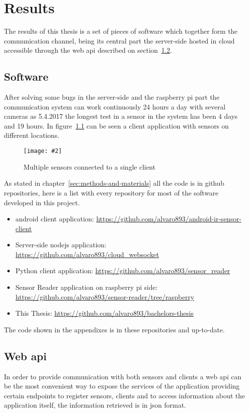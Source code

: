\documentclass[hidelinks,11pt,a4paper,oneside,article]{memoir}
\newcommand{\putimage}[3][10] %
{
\begin{figure}[h]
	\centering
	\captionsetup{justification=centering}
	\texttt{[image: \#2]}
	\caption{#3}
	\label{fig:#2}
\end{figure}
}
\begin{document}
\clearpage\chapter{Results}\label{sec:results}
The results of this thesis is a set of pieces of software which together form the communication channel, being its central part the server-side hosted in cloud accessible through the web \gls{api} described on section~\ref{sec:web-api}.



\section{Software}\label{sec:software}
After solving some bugs in the server-side and the raspberry pi part the communication system can work continuously 24 hours a day with several cameras as 5.4.2017 the longest test in a sensor in the system has been 4 days and 19 hours. In figure~\ref{fig:multi-camera} can be seen a client application with sensors on different locations.

     \putimage{multi-camera}{Multiple sensors connected to a single client}

As stated in chapter~\ref{sec:methods-and-materials} all the code is in \gls{github} repositories, here is a list with every repository for most of the software developed in this project.


\begin{itemize}
    \item \gls{android} client application: \url{https://github.com/alvaro893/android-ir-sensor-client}
    \item Server-side \gls{nodejs} application: \url{https://github.com/alvaro893/cloud_websocket}
    \item Python client application: \url{https://github.com/alvaro893/sensor_reader}
    \item Sensor Reader application on raspberry pi side: \url{https://github.com/alvaro893/sensor-reader/tree/raspberry}
    \item This Thesis: \url{https://github.com/alvaro893/bachelors-thesis}
\end{itemize}

The code shown in the appendixes is in these repositories and up-to-date.


\section{Web \gls{api}} \label{sec:web-api}
In order to provide communication with both sensors and clients a web \gls{api} can be the most convenient way to expose the services of the application providing certain endpoints to register sensors, clients and to access information about the application itself, the information retrieved is in \gls{json} format.
\end{document}

